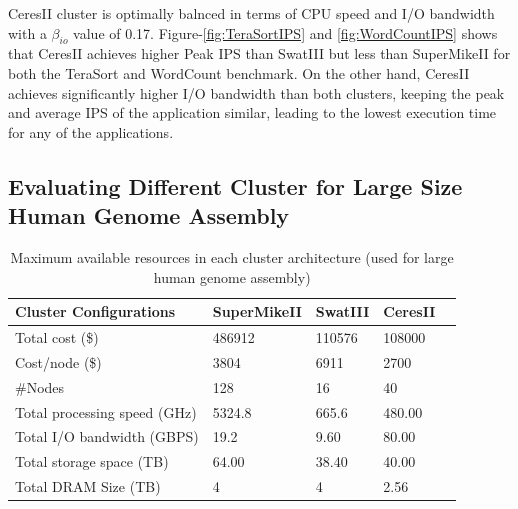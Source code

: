 \documentclass[journal]{IEEEtran}
\begin{document}
CeresII cluster is optimally balnced in terms of CPU speed and I/O bandwidth with a $\beta_{io}$ value of 0.17. Figure-\ref{fig:TeraSortIPS} and \ref{fig:WordCountIPS} shows that CeresII achieves higher Peak IPS than SwatIII but less than SuperMikeII for both the TeraSort and WordCount benchmark. On the other hand, CeresII achieves significantly higher I/O bandwidth than both clusters, keeping the peak and average IPS of the application similar, leading to the lowest execution time for any of the applications.

\subsection{Evaluating Different Cluster for Large Size Human Genome Assembly}
\begin{table}[!t]
\caption{Maximum available resources in each cluster architecture (used for large human genome assembly)}
\label{tab:TotalCluster}
\label{fig:perf}
\centering
\begin{tabular}{|p{2.5cm}|p{1.5cm}|p{1.5cm}|p{1.5cm}|p{1.5cm}|} \hline
Cluster Configurations & SuperMikeII & SwatIII & CeresII\\ \hline
Total cost (\$) & 486912 & 110576 & 108000\\ \hline
Cost/node (\$) & 3804 & 6911 & 2700\\ \hline
\#Nodes & 128 & 16 & 40\\ \hline
Total processing speed (GHz) & 5324.8 & 665.6 & 480.00\\ \hline
Total I/O bandwidth (GBPS) & 19.2 & 9.60 & 80.00\\ \hline
Total storage space (TB) & 64.00 & 38.40 & 40.00\\ \hline
Total DRAM Size (TB) & 4 & 4 & 2.56\\ \hline
\end{tabular}
\end{table}
\end{document}
